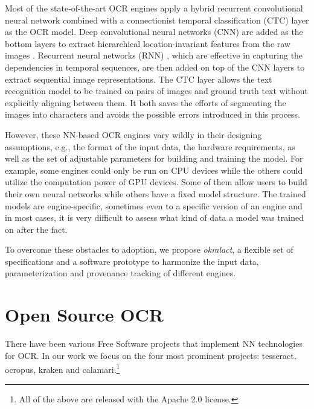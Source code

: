 \documentclass[conference]{IEEEtran}
\begin{document}
Most of the state-of-the-art OCR engines apply a hybrid recurrent convolutional
neural network combined with a connectionist temporal classification (CTC)
\cite{graves2006connectionist} layer as the OCR model. Deep convolutional
neural networks (CNN) \cite{krizhevsky2012imagenet} are added as the bottom
layers to extract hierarchical location-invariant features from the raw images
\cite{wick2018improving}. Recurrent neural networks (RNN)
\cite{mikolov2010recurrent}, which are effective in capturing the dependencies
in temporal sequences, are then added on top of the CNN layers to extract
sequential image representations. The CTC layer allows the text recognition
model to be trained on pairs of images and ground truth text without explicitly
aligning between them. It both saves the efforts of segmenting the images into
characters and avoids the possible errors introduced in this process. 


However, these NN-based OCR engines vary wildly in their designing assumptions,
e.g., the format of the input data, the hardware requirements, as well as the
set of adjustable parameters for building and training the model. For example,
some engines could only be run on CPU devices while the others could utilize
the computation power of GPU devices. Some of them allow users to build their
own neural networks while others have a fixed model structure. The trained
models are engine-specific, sometimes even to a specific version of an engine
and in most cases, it is very difficult to assess what kind of data a model was
trained on after the fact.

% 

To overcome these obstacles to adoption, we propose \textit{okralact}, a flexible set of specifications
and a software prototype to harmonize the input data, parameterization and provenance
tracking of different engines. 

\section*{Open Source OCR}

There have been various Free Software projects that implement NN technologies
for OCR. In our work we focus on the four most prominent projects: tesseract, ocropus,
kraken and calamari.\footnote{All of the above are released with the Apache 2.0 license.}
\end{document}
